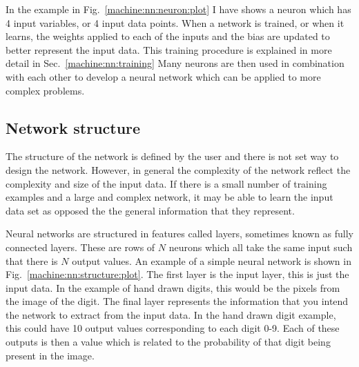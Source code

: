 In the example in Fig.~\ref{machine:nn:neuron:plot} I have shows a neuron which has 4 input variables, or 4 input data points. 
When a network is trained, or when it learns, the weights applied to each of the inputs and the bias are updated to better represent the input data.
This training procedure is explained in more detail in Sec.~\ref{machine:nn:training}
Many neurons are then used in combination with each other to develop a neural network which can be applied to more complex problems.

\subsection{\label{machine:nn:structure}Network structure}

The structure of the network is defined by the user and there is not set way to design the network.
However, in general the complexity of the network reflect the complexity and size of the input data.
If there is a small number of training examples and a large and complex network, it may be able to learn the input data set as opposed the the general information that they represent.

Neural networks are structured in features called layers, sometimes known as fully connected layers. 
These are rows of $N$ neurons which all take the same input such that there is $N$ output values.
An example of a simple neural network is shown in Fig.~\ref{machine:nn:structure:plot}.
The first layer is the input layer, this is just the input data.
In the example of hand drawn digits, this would be the pixels from the image of the digit.
The final layer represents the information that you intend the network to extract from the input data. 
In the hand drawn digit example, this could have 10 output values corresponding to each digit 0-9. 
Each of these outputs is then a value which is related to the probability of that digit being present in the image.  


